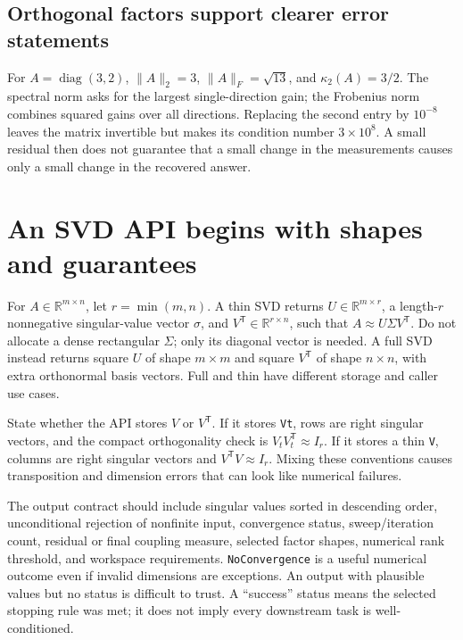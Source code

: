 \subsection{Orthogonal factors support clearer error statements}\label{02-foundations-ii-ch038-orthogonal-factors-support-clearer-error-statements}

For \(A=\operatorname{diag}(3,2)\), \(\|A\|_2=3\), \(\|A\|_F=\sqrt{13}\), and \(\kappa_2(A)=3/2\). The spectral norm asks for the largest single-direction gain; the Frobenius norm combines squared gains over all directions. Replacing the second entry by \(10^{-8}\) leaves the matrix invertible but makes its condition number \(3\times10^8\). A small residual then does not guarantee that a small change in the measurements causes only a small change in the recovered answer.

\section{An SVD API begins with shapes and guarantees}\label{02-foundations-ii-ch038-an-svd-api-begins-with-shapes-and-guarantees}

For \(A\in\mathbb R^{m\times n}\), let \(r=\min(m,n)\). A thin SVD returns \(U\in\mathbb R^{m\times r}\), a length-\(r\) nonnegative singular-value vector \(\sigma\), and \(V^\mathsf T\in\mathbb R^{r\times n}\), such that \(A\approx U\Sigma V^\mathsf T\). Do not allocate a dense rectangular \(\Sigma\); only its diagonal vector is needed. A full SVD instead returns square \(U\) of shape \(m\times m\) and square \(V^\mathsf T\) of shape \(n\times n\), with extra orthonormal basis vectors. Full and thin have different storage and caller use cases.

State whether the API stores \(V\) or \(V^\mathsf T\). If it stores \texttt{Vt}, rows are right singular vectors, and the compact orthogonality check is \(V_tV_t^\mathsf T\approx I_r\). If it stores a thin \texttt{V}, columns are right singular vectors and \(V^\mathsf TV\approx I_r\). Mixing these conventions causes transposition and dimension errors that can look like numerical failures.

The output contract should include singular values sorted in descending order, unconditional rejection of nonfinite input, convergence status, sweep/iteration count, residual or final coupling measure, selected factor shapes, numerical rank threshold, and workspace requirements. \texttt{NoConvergence} is a useful numerical outcome even if invalid dimensions are exceptions. An output with plausible values but no status is difficult to trust. A ``success'' status means the selected stopping rule was met; it does not imply every downstream task is well-conditioned.


